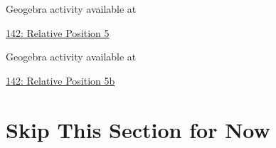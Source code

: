 \documentclass{ximera}
\begin{document}
\begin{example}
\begin{explanation}
Geogebra activity available at

\href{https://www.geogebra.org/classic/sn2cfjc4}{142: Relative Position 5}


 
\begin{onlineOnly}
    \begin{center}
\end{center}
\end{onlineOnly}

Geogebra activity available at

\href{https://www.geogebra.org/classic/rbkfbjau}{142: Relative Position 5b}




 
\end{explanation}


\end{example}






\section{Skip This Section for Now}
\end{document}
